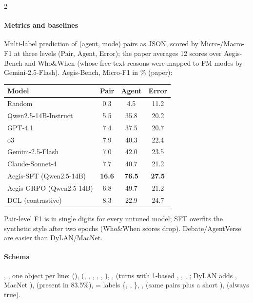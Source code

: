 \begin{multicols}{2}
\paragraph{Metrics and baselines} Multi-label prediction of (agent, mode) pairs as JSON, scored by Micro-/Macro-F1 at three levels (Pair, Agent, Error); the paper averages 12 scores over Aegis-Bench and Who\&When (whose free-text reasons were mapped to FM modes by Gemini-2.5-Flash). Aegis-Bench, Micro-F1 in \% (paper):

\begin{center}\small
\begin{tabular}{@{}lccc@{}}\toprule
Model & Pair & Agent & Error\\\midrule
Random & 0.3 & 4.5 & 11.2\\
Qwen2.5-14B-Instruct & 5.5 & 35.8 & 20.2\\
GPT-4.1 & 7.4 & 37.5 & 20.7\\
o3 & 7.9 & 40.3 & 22.4\\
Gemini-2.5-Flash & 7.0 & 42.0 & 23.5\\
Claude-Sonnet-4 & 7.7 & 40.7 & 21.2\\
Aegis-SFT (Qwen2.5-14B) & \textbf{16.6} & \textbf{76.5} & \textbf{27.5}\\
Aegis-GRPO (Qwen2.5-14B) & 6.8 & 49.7 & 21.2\\
DCL (contrastive) & 8.3 & 22.9 & 24.7\\\bottomrule
\end{tabular}
\end{center}
Pair-level F1 is in single digits for every untuned model; SFT overfits the synthetic style after two epochs (Who\&When scores drop). Debate/AgentVerse are easier than DyLAN/MacNet.

\paragraph{Schema} , , one object per line:  (\allowbreak{}),  (, , , , , ), ,  (turns with 1-based , , , ; DyLAN adds , MacNet ),  (present in 83.5\%),  = labels \{, , \}, ,  (same pairs plus a short ),  (always true).
\end{multicols}

